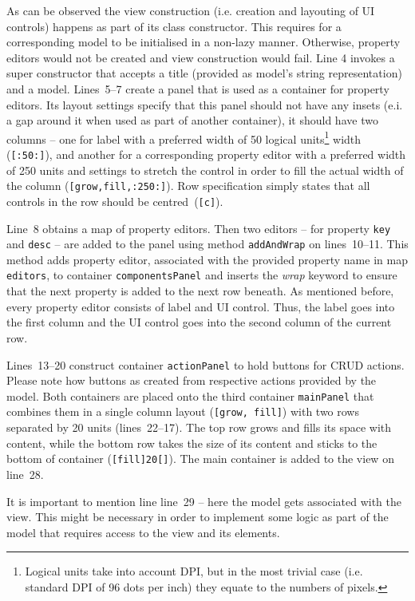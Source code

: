   As can be observed the view construction (i.e. creation and layouting of UI controls) happens as part of its class constructor.
  This requires for a corresponding model to be initialised in a non-lazy manner.
  Otherwise, property editors would not be created and view construction would fail.
  Line 4 invokes a super constructor that accepts a title (provided as model's string representation) and a model.
  Lines~5--7 create a panel that is used as a container for property editors.
  Its layout settings specify that this panel should not have any insets (e.i. a gap around it when used as part of another container), it should have two columns -- one for label with a preferred width of 50 logical units\footnote{Logical units take into account DPI, but in the most trivial case (i.e. standard DPI of 96 dots per inch) they equate to the numbers of pixels.} width (\texttt{[:50:]}), and another for a corresponding property editor with a preferred width of 250 units and settings to stretch the control in order to fill the actual width of the column (\texttt{[grow,fill,:250:]}).
  Row specification simply states that all controls in the row should be centred~(\texttt{[c]}).
  
  Line~8 obtains a map of property editors.
  Then two editors -- for property \texttt{key} and \texttt{desc} -- are added to the panel using method \texttt{addAndWrap} on lines~10--11.
  This method adds property editor, associated with the provided property name in map \texttt{editors}, to container \texttt{componentsPanel} and inserts the \emph{wrap} keyword to ensure that the next property is added to the next row beneath.
  As mentioned before, every property editor consists of label and UI control.
  Thus, the label goes into the first column and the UI control goes into the second column of the current row.
  
  Lines~13--20 construct container \texttt{actionPanel} to hold buttons for CRUD actions.
  Please note how buttons as created from respective actions provided by the model.
  Both containers are placed onto the third container \texttt{mainPanel} that combines them in a single column layout (\texttt{[grow, fill]}) with two rows separated by 20 units (lines~22--17).
  The top row grows and fills its space with content, while the bottom row takes the size of its content and sticks to the bottom of container (\texttt{[fill]20[]}).
  The main container is added to the view on line~28.
  
  It is important to mention line line~29 -- here the model gets associated with the view.
  This might be necessary in order to implement some logic as part of the model that requires access to the view and its elements.
  
